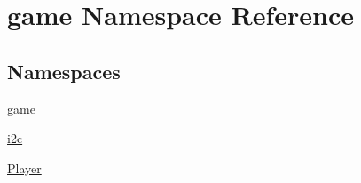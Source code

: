 \hypertarget{namespacegame}{}\section{game Namespace Reference}
\label{namespacegame}
\subsection*{Namespaces}
\begin{DoxyCompactItemize}
\item 
 \hyperlink{namespacegame_1_1game}{game}
\item 
 \hyperlink{namespacegame_1_1i2c}{i2c}
\item 
 \hyperlink{namespacegame_1_1_player}{Player}
\end{DoxyCompactItemize}
